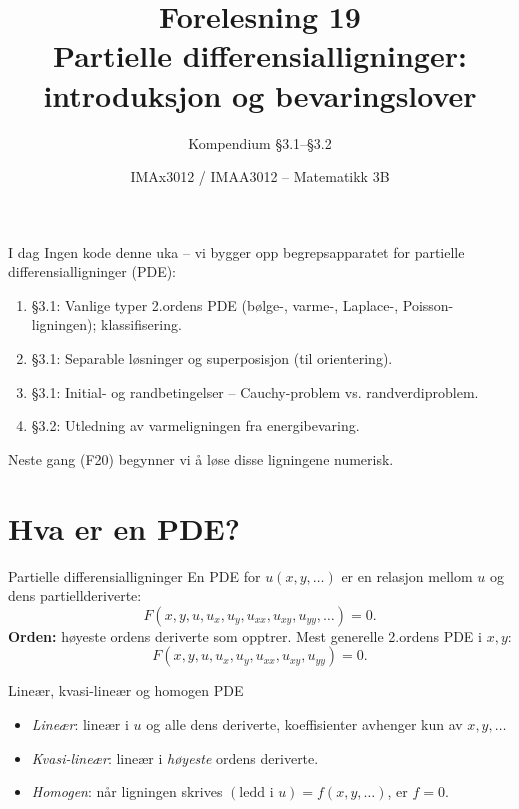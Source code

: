 \documentclass[11pt,aspectratio=169]{beamer}
\title[F19 -- PDE generelt]{Forelesning 19\\ Partielle differensialligninger: introduksjon og bevaringslover}
\subtitle{Kompendium §3.1--§3.2}
\author{IMAx3012 / IMAA3012 -- Matematikk 3B}
\date{}
\begin{document}
\begin{frame}
\titlepage
\end{frame}

\begin{frame}{I dag}
Ingen kode denne uka -- vi bygger opp begrepsapparatet for partielle differensialligninger (PDE):
\begin{enumerate}
\item §3.1: Vanlige typer 2.ordens PDE (bølge-, varme-, Laplace-, Poisson-ligningen); klassifisering.
\item §3.1: Separable løsninger og superposisjon (til orientering).
\item §3.1: Initial- og randbetingelser -- Cauchy-problem vs. randverdiproblem.
\item §3.2: Utledning av varmeligningen fra energibevaring.
\end{enumerate}
Neste gang (F20) begynner vi å løse disse ligningene numerisk.
\end{frame}

\section{Hva er en PDE?}

\begin{frame}{Partielle differensialligninger}
En PDE for $u(x,y,\ldots)$ er en relasjon mellom $u$ og dens partiellderiverte:
\[
F(x,y,u,u_x,u_y,u_{xx},u_{xy},u_{yy},\ldots) = 0.
\]
\textbf{Orden:} høyeste ordens deriverte som opptrer. Mest generelle 2.ordens PDE i $x,y$:
\[
F(x,y,u,u_x,u_y,u_{xx},u_{xy},u_{yy})=0.
\]
\begin{defnb}{Lineær, kvasi-lineær og homogen PDE}
\begin{itemize}
\item \emph{Lineær}: lineær i $u$ og alle dens deriverte, koeffisienter avhenger kun av $x,y,\ldots$
\item \emph{Kvasi-lineær}: lineær i \emph{høyeste} ordens deriverte.
\item \emph{Homogen}: når ligningen skrives $(\text{ledd i } u) = f(x,y,\ldots)$, er $f=0$.
\end{itemize}
\end{defnb}
\end{frame}
\end{document}

